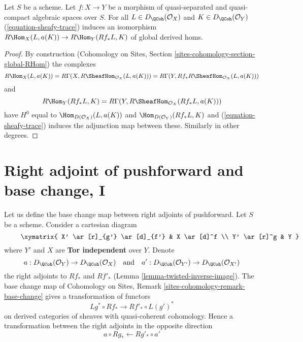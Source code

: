 \begin{lemma}
\label{lemma-iso-global-hom}
Let $S$ be a scheme.
Let $f : X \to Y$ be a morphism of quasi-separated and quasi-compact
algebraic spaces over $S$.
For all $L \in D_\QCoh(\mathcal{O}_X)$ and $K \in D_\QCoh(\mathcal{O}_Y)$
(\ref{equation-sheafy-trace}) induces an isomorphism
$R\Hom_X(L, a(K)) \to R\Hom_Y(Rf_*L, K)$ of global derived homs.
\end{lemma}

\begin{proof}
By construction (Cohomology on Sites, Section
\ref{sites-cohomology-section-global-RHom}) the complexes
$$
R\Hom_X(L, a(K)) =
R\Gamma(X, R\SheafHom_{\mathcal{O}_X}(L, a(K))) =
R\Gamma(Y, Rf_*R\SheafHom_{\mathcal{O}_X}(L, a(K)))
$$
and
$$
R\Hom_Y(Rf_*L, K) = R\Gamma(Y, R\SheafHom_{\mathcal{O}_X}(Rf_*L, a(K)))
$$
have $H^0$ equal to $\Hom_{D(\mathcal{O}_X)}(L, a(K))$ and
$\Hom_{D(\mathcal{O}_Y)}(Rf_*L, K)$ and
(\ref{equation-sheafy-trace}) induces the adjunction map
between these. Similarly in other degrees.
\end{proof}









\section{Right adjoint of pushforward and base change, I}
\label{section-base-change-map}

\noindent
Let us define the base change map between right adjoints of pushforward.
Let $S$ be a scheme. Consider a cartesian diagram
\begin{equation}
\label{equation-base-change}
\vcenter{
\xymatrix{
X' \ar[r]_{g'} \ar[d]_{f'} & X \ar[d]^f \\
Y' \ar[r]^g & Y
}
}
\end{equation}
where $Y'$ and $X$ are {\bf Tor independent} over $Y$. Denote
$$
a  : D_\QCoh(\mathcal{O}_Y) \to D_\QCoh(\mathcal{O}_X)
\quad\text{and}\quad
a' : D_\QCoh(\mathcal{O}_{Y'}) \to D_\QCoh(\mathcal{O}_{X'})
$$
the right adjoints to $Rf_*$ and $Rf'_*$
(Lemma \ref{lemma-twisted-inverse-image}).
The base change map of
Cohomology on Sites, Remark \ref{sites-cohomology-remark-base-change}
gives a transformation of functors
$$
Lg^* \circ Rf_* \longrightarrow Rf'_* \circ L(g')^*
$$
on derived categories of sheaves with quasi-coherent cohomology.
Hence a transformation between the right adjoints in the opposite direction
$$
a \circ Rg_* \longleftarrow Rg'_* \circ a'
$$

